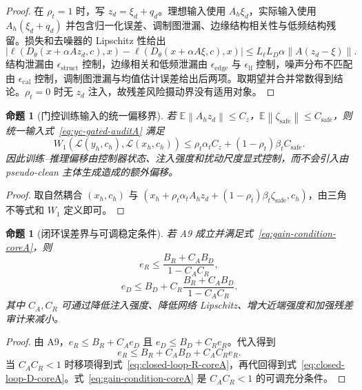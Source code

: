 \documentclass[11pt,a4paper,UTF8,fontset=fandol]{ctexart}
\newtheorem{proposition}[theorem]{命题}
\theoremstyle{definition}
\newcommand{\norm}[1]{\left\lVert#1\right\rVert}
\newcommand{\abs}[1]{\left\lvert#1\right\rvert}
\newcommand{\E}{\mathbb{E}}
\begin{document}
\begin{proof}
在 $\rho_t=1$ 时，写 $z_d=\xi_d+q_d$。理想输入使用 $A_h\xi_d$，实际输入使用 $A_h(\xi_d+q_d)$ 并包含归一化误差、调制图泄漏、边缘结构相关性与低频结构残留。损失和去噪器的 Lipschitz 性给出
\begin{equation}
    \abs{\ell(D_\theta(x+\alpha A z_d,c),x)-\ell(D_\theta(x+\alpha A\xi,c),x)}
    \le L_\ell L_D\alpha\norm{A(z_d-\xi)}.
\end{equation}
结构泄漏由 $\epsilon_{\mathrm{struct}}$ 控制，边缘相关和低频泄漏由 $\epsilon_{\mathrm{edge}}$ 与 $\epsilon_{\mathrm{lf}}$ 控制，噪声分布不匹配由 $\epsilon_{\mathrm{cal}}$ 控制，调制图泄漏与均值估计误差给出后两项。取期望并合并常数得到结论。$\rho_t=0$ 时无 $z_d$ 注入，故残差风险摄动界没有适用对象。
\end{proof}

\begin{proposition}[门控训练输入的统一偏移界]
\label{prop:gated-shift-auditA}
若 $\E\norm{A_hz_d}\le C_z$，$\E\norm{\zeta_{\mathrm{safe}}}\le C_{\mathrm{safe}}$，则统一输入式~\eqref{eq:yc-gated-auditA} 满足
\begin{equation}
\label{eq:gated-shift-bound-auditA}
    W_1(\mathcal L(y_h,c_h),\mathcal L(x_h,c_h))
    \le
    \rho_t\alpha_t C_z+(1-\rho_t)\beta_tC_{\mathrm{safe}}.
\end{equation}
因此训练--推理偏移由控制器状态、注入强度和扰动尺度显式控制，而不会引入由 pseudo-clean 主体生成造成的额外偏移。
\end{proposition}

\begin{proof}
取自然耦合 $(x_h,c_h)$ 与 $(x_h+\rho_t\alpha_tA_hz_d+(1-\rho_t)\beta_t\zeta_{\mathrm{safe}},c_h)$，由三角不等式和 $W_1$ 定义即可。
\end{proof}

\begin{proposition}[闭环误差界与可调稳定条件]
\label{prop:closed-loop-coreA}
若 A9 成立并满足式~\eqref{eq:gain-condition-coreA}，则
\begin{equation}
\label{eq:closed-loop-R-coreA}
    e_R\le\frac{B_R+C_AB_D}{1-C_AC_R},
\end{equation}
\begin{equation}
\label{eq:closed-loop-D-coreA}
    e_D\le B_D+C_R\frac{B_R+C_AB_D}{1-C_AC_R}.
\end{equation}
其中 $C_A,C_R$ 可通过降低注入强度、降低网络 Lipschitz、增大近端强度和加强残差审计来减小。
\end{proposition}

\begin{proof}
由 A9，$e_R\le B_R+C_Ae_D$ 且 $e_D\le B_D+C_Re_R$。代入得到
\begin{equation}
    e_R\le B_R+C_AB_D+C_AC_Re_R.
\end{equation}
当 $C_AC_R<1$ 时移项得到式~\eqref{eq:closed-loop-R-coreA}，再代回得到式~\eqref{eq:closed-loop-D-coreA}。式~\eqref{eq:gain-condition-coreA} 是 $C_AC_R<1$ 的可调充分条件。
\end{proof}
\end{document}
